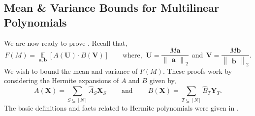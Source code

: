 \documentclass[11pt]{article}
\newcommand{\insquare}[1]{\left [ #1 \right ]}
\newcommand{\norm}[2]{\begin{Vmatrix} #2 \end{Vmatrix}_{#1}}
\DeclareMathOperator*{\Ex}{\mathbb{E}}
\newcommand{\sAND}{\ \mathrm{and} \ }
\newcommand{\what}[1]{\widehat{#1}}
\newcommand{\ba}{{\bm a}}
\newcommand{\bb}{{\bm b}}
\newcommand{\bU}{\mathbf{U}}
\newcommand{\bV}{\mathbf{V}}
\newcommand{\bX}{\mathbf{X}}
\newcommand{\bY}{\mathbf{Y}}
\begin{document}
\subsection{Mean \& Variance Bounds for Multilinear Polynomials}\label{subec:bds_for_gen_multilinear_polys}

We are now ready to prove . Recall that,
\[ F(M) = \Ex\limits_{\ba, \bb} \insquare{A(\bU) \cdot B(\bV)} \qquad \text{where, }\ \bU = \frac{M\ba}{\norm{2}{\ba}} \ \sAND \ \bV = \frac{M\bb}{\norm{2}{\bb}}.\]
We wish to bound the mean and variance of $F(M)$. These proofs work by considering the Hermite expansions of $A$ and $B$ given by,
\[A(\bX) = \sum_{S \subseteq [N]} \what{A}_S \bX_S \qquad \sAND \qquad B(\bX) = \sum_{T \subseteq [N]} \what{B}_T \bY_T.\]
The basic definitions and facts related to Hermite polynomials were given in .
\end{document}
